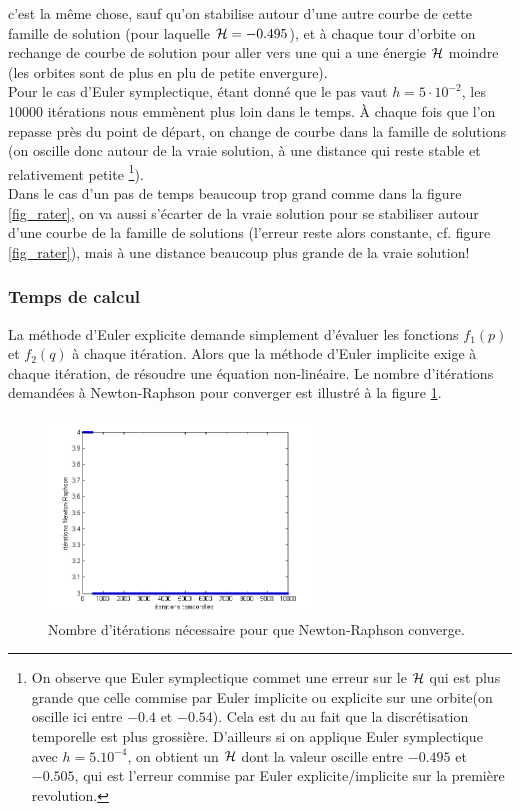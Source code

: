 c'est la même chose, sauf qu'on stabilise autour d'une autre courbe de cette famille de solution (pour laquelle $\mathcal{H} = -0.495$), et à chaque tour d'orbite on rechange de courbe de solution pour aller vers une qui a une énergie $\mathcal{H}$ moindre (les orbites sont de plus en plu de petite envergure).\\
Pour le cas d'Euler symplectique, étant donné que le pas vaut $h=5 \cdot 10^{-2}$, les 10000 itérations nous emmènent plus loin dans le temps.
À chaque fois que l'on repasse près du point de départ,
on change de courbe dans la famille de solutions (on oscille donc autour de la vraie solution,
à une distance qui reste stable et relativement petite
\footnote{On observe que Euler symplectique commet une erreur sur le $\mathcal{H}$ qui est plus grande que celle commise par Euler implicite ou explicite sur une orbite(on oscille ici entre $-0.4$ et $-0.54$).
Cela est du au fait que la discrétisation temporelle est plus grossière.
D'ailleurs si on applique Euler symplectique avec $h=5.10^{-4}$, on obtient un $\mathcal{H}$ dont la valeur oscille entre $-0.495$ et $-0.505$, qui est l'erreur commise par Euler explicite/implicite sur la première revolution.}).\\
Dans le cas d'un pas de temps beaucoup trop grand comme dans la figure \ref{fig_rater},
on va aussi s'écarter de la vraie solution pour se stabiliser autour d'une courbe de la famille de solutions
(l'erreur reste alors constante, cf. figure \ref{fig_rater}), mais à une distance beaucoup plus grande de la vraie solution!



\subsubsection{Temps de calcul}
La méthode d'Euler explicite demande simplement d'évaluer les fonctions $f_1(p)$ et $f_2(q)$ à chaque itération.
Alors que la méthode d'Euler implicite exige à chaque itération,
de résoudre une équation non-linéaire.
Le nombre d'itérations demandées à Newton-Raphson pour converger est illustré à la figure \ref{IterNR}.

\begin{figure}
\centering
\includegraphics[width=7cm]{images/iterationNR.png}
\caption{Nombre d'itérations nécessaire pour que Newton-Raphson converge.}
\label{IterNR}
\end{figure}

